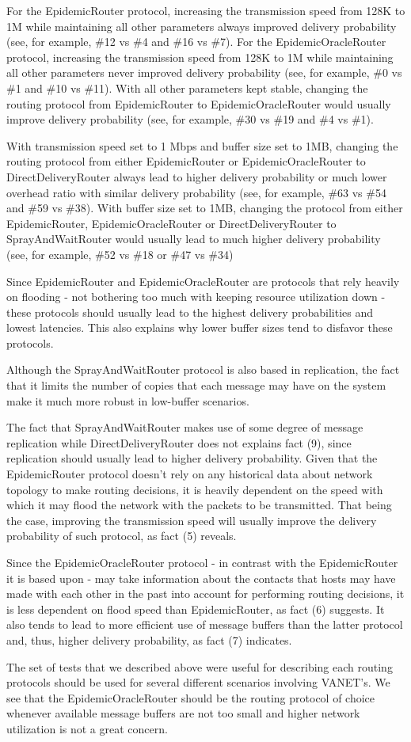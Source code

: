 For the EpidemicRouter protocol, increasing the transmission speed from 128K to
1M while maintaining all other parameters always improved delivery probability
(see, for example, \#12 vs \#4 and \#16 vs \#7).
For the EpidemicOracleRouter protocol, increasing the transmission speed from
128K to 1M while maintaining all other parameters never improved delivery
probability (see, for example, \#0 vs \#1 and \#10 vs \#11).
With all other parameters kept stable, changing the routing protocol from
EpidemicRouter to EpidemicOracleRouter would usually improve delivery
probability (see, for example, \#30 vs \#19 and \#4 vs \#1).

With transmission speed set to 1 Mbps and buffer size set to 1MB, changing the
routing protocol from either EpidemicRouter or EpidemicOracleRouter to
DirectDeliveryRouter always lead to higher delivery probability or much lower
overhead ratio with similar delivery probability (see, for example, \#63 vs
\#54 and \#59 vs \#38).
With buffer size set to 1MB, changing the protocol from either
EpidemicRouter, EpidemicOracleRouter or DirectDeliveryRouter to
SprayAndWaitRouter would usually lead to much higher delivery probability (see,
for example, \#52 vs \#18 or \#47 vs \#34)

Since EpidemicRouter and EpidemicOracleRouter are protocols that rely heavily
on flooding - not bothering too much with keeping resource utilization down -
these protocols should usually lead to the highest delivery probabilities and
lowest latencies. This also explains why lower
buffer sizes tend to disfavor these protocols.

Although the SprayAndWaitRouter protocol is also based in replication, the fact
that it limits the number of copies that each message may have on the system
make it much more robust in low-buffer scenarios.

The fact that SprayAndWaitRouter makes use of some degree of message
replication while DirectDeliveryRouter does not explains fact (9), since
replication should usually lead to higher delivery probability.
Given that the EpidemicRouter protocol doesn't rely on any historical data
about network topology to make routing decisions, it is heavily dependent on
the speed with which it may flood the network with the packets to be
transmitted. That being the case, improving the transmission speed will usually
improve the delivery probability of such protocol, as fact (5) reveals.

Since the EpidemicOracleRouter protocol - in contrast with the EpidemicRouter
it is based upon - may take information about the contacts that hosts may have
made with each other in the past into account for performing routing decisions,
it is less dependent on flood speed than EpidemicRouter, as fact (6) suggests.
It also tends to lead to more efficient use of message buffers than the latter
protocol and, thus, higher delivery probability, as fact (7) indicates.

The set of tests that we described above were useful for describing each
routing protocols should be used for several different scenarios involving
VANET's. We see that the EpidemicOracleRouter should be the routing
protocol of choice whenever available message buffers are not too small and
higher network utilization is not a great concern.

